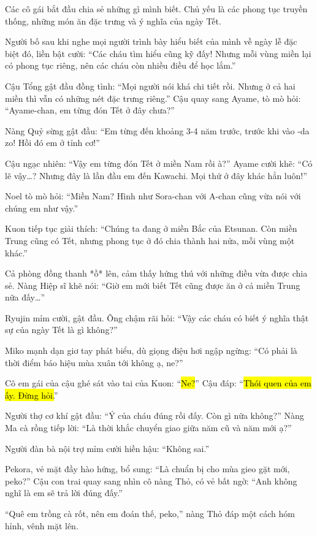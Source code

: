 \documentclass[../main.tex]{subfiles}
\begin{document}
Các cô gái bắt đầu chia sẻ những gì mình biết. Chủ yếu là các phong tục truyền thống, những món ăn đặc trưng và ý nghĩa của ngày Tết.

Người bố sau khi nghe mọi người trình bày hiểu biết của mình về ngày lễ đặc biệt đó, liền bật cười: ``Các cháu tìm hiểu cũng kỹ đấy! Nhưng mỗi vùng miền lại có phong tục riêng, nên các cháu còn nhiều điều để học lắm.''

Cậu Tổng gật đầu đồng tình: ``Mọi người nói khá chi tiết rồi. Nhưng ở cả hai miền thì vẫn có những nét đặc trưng riêng.'' Cậu quay sang Ayame, tò mò hỏi: ``Ayame-chan, em từng đón Tết ở đây chưa?''

Nàng Quỷ sừng gật đầu: ``Em từng đến khoảng 3-4 năm trước, trước khi vào \hll-da zo! Hồi đó em ở tỉnh  cơ!''

Cậu ngạc nhiên: ``Vậy em từng đón Tết ở miền Nam rồi à?'' Ayame cười khẽ: ``Có lẽ vậy\dots? Nhưng đây là lần đầu em đến Kawachi. Mọi thứ ở đây khác hẳn luôn!''

Noel tò mò hỏi: ``Miền Nam? Hình như Sora-chan với A-chan cũng vừa nói với chúng em như vậy.''

Kuon tiếp tục giải thích: ``Chúng ta đang ở miền Bắc của Etsunan. Còn miền Trung cũng có Tết, nhưng phong tục ở đó chia thành hai nửa, mỗi vùng một khác.''

Cả phòng đồng thanh *ồ* lên, cảm thấy hứng thú với những điều vừa được chia sẻ. Nàng Hiệp sĩ khẽ nói: ``Giờ em mới biết Tết cũng được ăn ở cả miền Trung nữa đấy\dots''

Ryujin mỉm cười, gật đầu. Ông chậm rãi hỏi: ``Vậy các cháu có biết ý nghĩa thật sự của ngày Tết là gì không?''

Miko mạnh dạn giơ tay phát biểu, dù giọng điệu hơi ngập ngừng: ``Có phải là thời điểm báo hiệu mùa xuân tới không ạ, ne?''

Cô em gái của cậu ghé sát vào tai của Kuon: ``\hl{Ne?}'' Cậu đáp: ``\hl{Thói quen của em ấy. Đừng hỏi.}''

Người thợ cơ khí gật đầu: ``Ý của cháu đúng rồi đấy. Còn gì nữa không?'' Nàng Ma cà rồng tiếp lời: ``Là thời khắc chuyển giao giữa năm cũ và năm mới ạ?''

Người đàn bà nội trợ mỉm cười hiền hậu: ``Không sai.''

Pekora, vẻ mặt đầy hào hứng, bổ sung: ``Là chuẩn bị cho mùa gieo gặt mới, peko?'' Cậu con trai quay sang nhìn cô nàng Thỏ, có vẻ bất ngờ: ``Anh không nghĩ là em sẽ trả lời đúng đấy.''

``Quê em trồng cà rốt, nên em đoán thế, peko,'' nàng Thỏ đáp một cách hóm hỉnh, vênh mặt lên.
\end{document}
